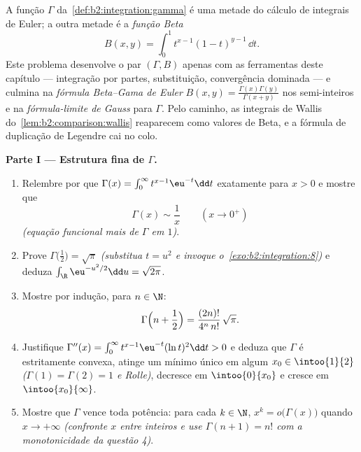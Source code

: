 \begin{problem}\label{pb:b2:integration:1}
A função $\Gamma$ da~\cref{def:b2:integration:gamma} é uma
metade do cálculo de integrais de Euler; a outra metade é a
\emph{função Beta}
\[
B(x, y) = \int_0^1 t^{x-1}(1 - t)^{y-1}\,\dd t .
\]
Este problema desenvolve o par $(\Gamma, B)$ apenas com as ferramentas
deste capítulo --- integração por partes, substituição,
convergência dominada --- e culmina na \emph{fórmula
Beta--Gama de Euler} $B(x,y) = \frac{\Gamma(x)\Gamma(y)}
{\Gamma(x+y)}$ nos semi-inteiros e na \emph{fórmula-limite
de Gauss} para $\Gamma$. Pelo caminho,
as integrais de Wallis do~\cref{lem:b2:comparison:wallis} reaparecem
como valores de Beta, e a fórmula de duplicação de Legendre cai no colo.

\medskip
\noindent\textbf{Parte I --- Estrutura fina de $\Gamma$.}
\begin{enumerate}
  \item Relembre por que $\Gamma(x) = \int_0^\infty t^{x-1}\eu^{-t}\dd
        t$  exatamente para $x > 0$ e mostre que
        \[
        \Gamma(x) \sim \frac1x \qquad (x \to 0^+)
        \]
        \emph{(equação funcional mais  de $\Gamma$ em
        $1$)}.
  \item Prove $\Gamma\bigl(\tfrac12\bigr) = \sqrt\pi$
        \emph{(substitua $t = u^2$ e invoque
        o~\cref{exo:b2:integration:8})} e deduza
        $\int_\R \eu^{-u^2/2}\dd u = \sqrt{2\pi}$.
  \item Mostre por indução, para $n \in \N$:
        \[
        \Gamma\Bigl(n + \frac12\Bigr)
        = \frac{(2n)!}{4^n\,n!}\,\sqrt\pi .
        \]
  \item Justifique $\Gamma''(x) = \int_0^\infty
        t^{x-1}\eu^{-t}(\ln t)^2\dd t > 0$ e deduza que
        $\Gamma$ é estritamente convexa, atinge um mínimo único em
        algum $x_0 \in \intoo{1}{2}$ \emph{($\Gamma(1) = \Gamma(2)
        = 1$ e Rolle)}, decresce em $\intoo{0}{x_0}$ e
        cresce em $\intoo{x_0}{\infty}$.
  \item Mostre que $\Gamma$ vence toda potência: para cada $k \in
        \N$, $x^k = o\bigl(\Gamma(x)\bigr)$ quando $x \to +\infty$
        \emph{(confronte $x$ entre inteiros e use $\Gamma(n+1)
        = n!$ com a monotonicidade da questão 4)}.
\end{enumerate}


\end{problem}
